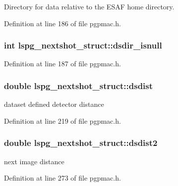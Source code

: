 Directory for data relative to the E\-S\-A\-F home directory. 



Definition at line 186 of file pgpmac.\-h.

\hypertarget{structlspg__nextshot__struct_a8dea57b78b92d67d83ccbb6ed6da13ca}{
\subsubsection[{dsdir\-\_\-isnull}]{\setlength{\rightskip}{0pt plus 5cm}int lspg\-\_\-nextshot\-\_\-struct\-::dsdir\-\_\-isnull}}\label{structlspg__nextshot__struct_a8dea57b78b92d67d83ccbb6ed6da13ca}


Definition at line 187 of file pgpmac.\-h.

\hypertarget{structlspg__nextshot__struct_acab9431a911f5bb11296cbfb271fb83a}{
\subsubsection[{dsdist}]{\setlength{\rightskip}{0pt plus 5cm}double lspg\-\_\-nextshot\-\_\-struct\-::dsdist}}\label{structlspg__nextshot__struct_acab9431a911f5bb11296cbfb271fb83a}


dataset defined detector distance 



Definition at line 219 of file pgpmac.\-h.

\hypertarget{structlspg__nextshot__struct_a516827749068577217b27860a01e6041}{
\subsubsection[{dsdist2}]{\setlength{\rightskip}{0pt plus 5cm}double lspg\-\_\-nextshot\-\_\-struct\-::dsdist2}}\label{structlspg__nextshot__struct_a516827749068577217b27860a01e6041}


next image distance 



Definition at line 273 of file pgpmac.\-h.

